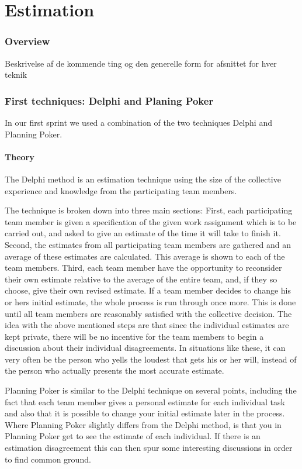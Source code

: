 \part{Estimation}
\section{Overview}
Beskrivelse af de kommende ting og den generelle form for afsnittet for hver teknik
\section{First techniques: Delphi and Planing Poker}
In our first sprint we used a combination of the two techniques Delphi and Planning Poker.

\subsection{Theory}


The Delphi method is an estimation technique using the size of the collective experience and knowledge from the participating team members.

The technique is broken down into three main sections:
First, each participating team member is given a specification of the given work assignment which is to be carried out, and asked to give an estimate of the time it will take to finish it.
Second, the estimates from all participating team members are gathered and an average of these estimates are calculated. This average is shown to each of the team members.
Third, each team member have the opportunity to reconsider their own estimate relative to the average of the entire team, and, if they so choose, give their own revised estimate.
If a team member decides to change his or hers initial estimate, the whole process is run through once more. This is done until all team members are reasonably satisfied with the collective decision. 
The idea with the above mentioned steps are that since the individual estimates are kept private, there will be no incentive for the team members to begin a discussion about their individual disagreements. In situations like these, it can very often be the person who yells the loudest that gets his or her will, instead of the person who actually presents the most accurate estimate.


Planning Poker is similar to the Delphi technique on several points, including the fact that each team member gives a personal estimate for each individual task and also that it is possible to change your initial estimate later in the process. Where Planning Poker slightly differs from the Delphi method, is that you in Planning Poker get to see the estimate of each individual. If there is an estimation disagreement this can then spur some interesting discussions in order to find common ground. 


